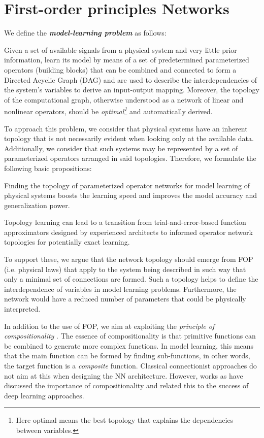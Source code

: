 \section{First-order principles Networks}\label{sec:FOPnets}
We define the \emph{\textbf{model-learning problem}} as follows:

Given a set of available signals from a physical system and very little prior information, learn its model by means of a set of predetermined parameterized operators (building blocks) that can be combined and connected to form a Directed Acyclic Graph (DAG) and are used to describe the interdependencies of the system's variables to derive an input-output mapping. Moreover, the topology of the computational graph, otherwise understood as a network of linear and nonlinear operators, should be \emph{optimal\footnote{Here optimal means the best topology that explains the dependencies between variables.}} and automatically derived.

To approach this problem, we consider that physical systems have an inherent topology that is not necessarily evident when looking only at the available data. Additionally, we consider that such systems may be represented by a set of parameterized operators arranged in said topologies. Therefore, we formulate the following basic propositions:
\begin{prop}
Finding the topology of parameterized operator networks for model learning of physical systems boosts the learning speed and improves the model accuracy and generalization power.
\end{prop}
\begin{prop}
Topology learning can lead to a transition from trial-and-error-based function approximators designed by experienced architects to informed operator network topologies for potentially exact learning.
\end{prop}

To support these, we argue that the network topology should emerge from FOP (i.e. physical laws) that apply to the system being described in such way that only a minimal set of connections are formed. Such a topology helps to define the interdependence of variables in model learning problems. Furthermore, the network would have a reduced number of parameters that could be physically interpreted.

In addition to the use of FOP, we aim at exploiting the \textit{principle of compositionality} \cite{LakeUllTenGer2016}. The essence of compositionality is that primitive functions can be combined to generate more complex functions. In model learning, this means that the main function can be formed by finding sub-functions, in other words, the target function is a \emph{composite} function. Classical connectionist approaches do not aim at this when designing the NN architecture. However, works as \cite{MhaskarLiaPog2016} have discussed the importance of compositionality and related this to the success of deep learning approaches. 

